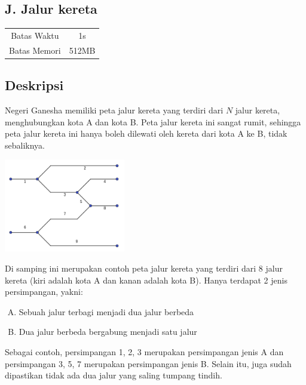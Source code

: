 \documentclass{article}
\begin{document}
\begin{center}
    \section*{J. Jalur kereta}

    \begin{tabular}{ | c c | }
        \hline
        Batas Waktu  & 1s \\
        Batas Memori & 512MB \\
        \hline
    \end{tabular}
\end{center}

\subsection*{Deskripsi}

Negeri Ganesha memiliki peta jalur kereta yang terdiri dari $N$ jalur kereta, menghubungkan kota A dan kota B.
Peta jalur kereta ini sangat rumit, sehingga peta jalur kereta ini hanya boleh dilewati oleh kereta dari kota A ke B, tidak sebaliknya.

\begin{multicols}{2}
\begin{center}
    \includegraphics[width=200px]{sample-1}
\end{center}

Di samping ini merupakan contoh peta jalur kereta yang terdiri dari 8 jalur kereta (kiri adalah kota A dan kanan adalah kota B).
Hanya terdapat 2 jenis persimpangan, yakni:
\begin{enumerate}[A.]
    \setlength{\itemsep}{0pt}
    \item Sebuah jalur terbagi menjadi dua jalur berbeda
    \item Dua jalur berbeda bergabung menjadi satu jalur
\end{enumerate}
Sebagai contoh, persimpangan 1, 2, 3 merupakan persimpangan jenis A dan persimpangan 3, 5, 7 merupakan persimpangan jenis B.
Selain itu, juga sudah dipastikan tidak ada dua jalur yang saling tumpang tindih.
\end{multicols}
\end{document}
